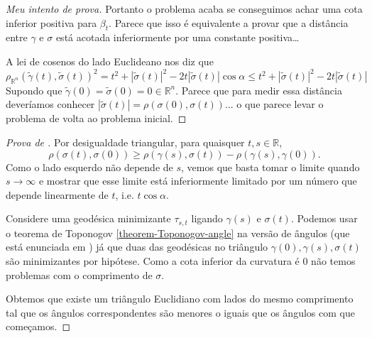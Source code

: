 \begin{proof}[Meu intento de prova]
Portanto o problema acaba se conseguimos achar uma cota inferior positiva para
$\beta_t$. Parece que isso é equivalente a provar que a distância entre
$\gamma$ e $\sigma$ está acotada inferiormente por uma constante positiva…

A lei de cosenos do lado Euclideano nos diz que
$$
\rho_{\mathbb{R}^n}(\tilde{\gamma}(t),\tilde{\sigma}(t))^2=
t^2+|\tilde{\sigma}(t)|^2-2t |\tilde{\sigma}(t)|\cos \alpha
\leq t^2+|\tilde{\sigma}(t)|^2-2t |\tilde{\sigma}(t)|
$$
Supondo que $\tilde{\gamma}(0)=\tilde{\sigma}(0)=0 \in \mathbb{R}^n$. 
Parece que para medir essa distância deveríamos conhecer
$|\tilde{\sigma}(t)|=\rho(\sigma(0),\sigma(t))$...
 o que parece levar o problema de volta ao
problema inicial.
\end{proof}

\begin{proof}[Prova de \cite{Cheeger-Ebin}]
Por desigualdade triangular, para quaisquer $t,s \in \mathbb{R}$,
$$
\rho(\sigma(t),\sigma(0)) \geq
\rho(\gamma(s),\sigma(t))-\rho(\gamma(s),\gamma(0)).
$$
Como o lado esquerdo não depende de $s$, vemos que basta tomar o limite quando 
$s\to \infty$ e mostrar que esse limite está inferiormente limitado por um
número que depende linearmente de $t$, i.e. $t \cos\alpha$.

Considere uma geodésica minimizante $\tau_{s,t}$ ligando $\gamma(s)$ e
$\sigma(t)$. Podemos usar o teorema de Toponogov \ref{theorem-Toponogov-angle}
na versão de ângulos (que está enunciada em \cite{Cheeger-Ebin}) já que duas das
geodésicas no triângulo $\gamma(0),\gamma(s),\sigma(t)$ são minimizantes por
hipótese. Como a cota inferior da curvatura é 0 não temos problemas com o
comprimento de $\sigma$.

Obtemos que existe um triângulo Euclidiano com lados do mesmo comprimento tal
que os ângulos correspondentes são menores o iguais que os ângulos com que
começamos.


\end{proof}

